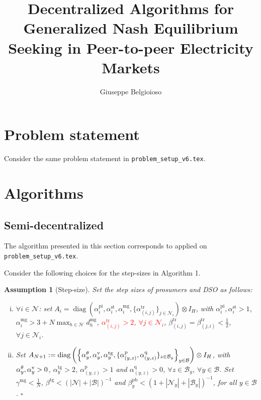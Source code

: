 \documentclass[10pt]{article}
\title{Decentralized Algorithms for Generalized Nash Equilibrium Seeking in Peer-to-peer Electricity Markets}
\author{Giuseppe Belgioioso}
\newtheorem{definitiox	n}{Definition}{\it}{}
\newtheorem{assumption}{Assumption}{\it}{}
\newcommand{\mc}{\mathcal}
\newcommand{\red}{\textcolor{red}}
\newcommand{\diag}{\operatorname{diag}}
\newcommand{\0}{\mathbf{0}}
\newcommand{\1}{\mathbf{1}}
\begin{document}
\maketitle

\section{Problem statement}
Consider the same problem statement in \texttt{problem\_setup\_v6.tex}.


\section{Algorithms}
\subsection{Semi-decentralized}

The algorithm presented in this section corresponds to \cite[Alg. 6B]{belgioioso2020semi} applied on  \texttt{problem\_setup\_v6.tex}.

Consider the following choices for the step-sizes in Algorithm 1.
\smallskip

\begin{assumption}[Step-size]\label{ass:SSS}
Set the step sizes of prosumers and DSO as follows:
\begin{enumerate}[(i)]
\item $\forall i \in \mc N$: set $A_i = \diag( \alpha_{i}^{\text{pi}}, \alpha_{i}^{\text{st}} , \alpha_{i}^{\text{mg}} , \{ \alpha_{(i,j)}^{\text{tr}} \}_{j \in \mc N_i} ) \otimes I_H$, with $\alpha_{i}^{\text{pi}}, \alpha_{i}^{\text{st}} > 1$, $ \alpha_{i}^{\text{mg}} > 3 + N \max_{h\in \mc H} d_h^{\text{mg}} $, \red{$\alpha_{(i,j)}^{\text{tr}} > 2$, $\forall j \in \mc N_i$}, $\beta^{\text{tr}}_{(i,j)} = \beta^{\text{tr}}_{ (j,i)} < \frac{1}{2}$, $\forall j \in \mc N_i$. 

\item Set $A_{N+1}:=\diag\left(
\left\{
\alpha_y^{\theta},\alpha^{\text v}_y, \alpha_y^{\text{tg}},
\{ 
\alpha^\text{p}_{(y,z)}, \alpha^{\text{q}}_{(y,z)} 
\}_{z \in \mc B_y}
\right\}_{y \in \mc B}
\right) \otimes I_H
$, with $\alpha_y^{\theta},\alpha^{\text v}_y > 0$, $\alpha_y^{\text{tg}} > 2$, $\alpha^{\text{p}}_{(y,z)} > 1$ and $ \alpha^{\text{q}}_{(y,z)} > 0 $, $\forall z \in \mc B_y$, $ \forall y \in \mc B$.
Set $\gamma^{\text{mg}} < \frac{1}{N}$, $\beta^{\text{tg}} < (|\mc N| + |\mc B|)^{-1}$ and $\beta_y^{\text{pb}} < (1+|\mc N_y|+|\mc B_y|)^{-1}$, for all $y \in \mc B$.
{\hfill $\square$}
\end{enumerate}


\end{assumption}
\end{document}
